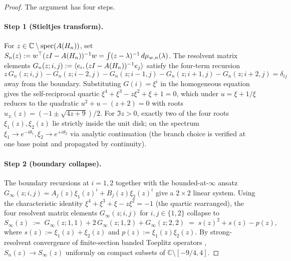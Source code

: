 \begin{proof}
The argument has four steps.

\paragraph{Step 1 (Stieltjes transform).}
For $z \in \mathbb{C} \setminus \operatorname{spec}(A(H_{n}))$, set
$S_{n}(z) := w^{\top}(zI - A(H_{n}))^{-1} w
= \int (z - \lambda)^{-1}\, d\mu_{w, n}(\lambda)$. The resolvent
matrix elements $G_{n}(z; i, j) := \langle e_{i}, (zI - A(H_{n}))^{-1} e_{j}\rangle$
satisfy the four-term recursion
\[
z\, G_{n}(z; i, j) - G_{n}(z; i-2, j) - G_{n}(z; i-1, j) - G_{n}(z; i+1, j) - G_{n}(z; i+2, j) = \delta_{ij}
\]
away from the boundary. Substituting $G(i) = \xi^{i}$ in the
homogeneous equation gives the self-reciprocal quartic
$\xi^{4} + \xi^{3} - z\xi^{2} + \xi + 1 = 0$, which under $u = \xi + 1/\xi$
reduces to the quadratic $u^{2} + u - (z + 2) = 0$ with roots
$u_{\pm}(z) = (-1 \pm \sqrt{4z + 9})/2$. For $\Im z > 0$, exactly two
of the four roots $\xi_{1}(z), \xi_{2}(z)$ lie strictly inside the
unit disk; on the spectrum
$\xi_{1} \to e^{-i\theta_{1}}, \xi_{2} \to e^{+i\theta_{2}}$ via
analytic continuation (the branch choice is verified at one base
point and propagated by continuity).

\paragraph{Step 2 (boundary collapse).}
The boundary recursions at $i = 1, 2$ together with the
bounded-at-$\infty$ ansatz $G_{\infty}(z; i, j) = A_{j}(z) \xi_{1}(z)^{i} + B_{j}(z) \xi_{2}(z)^{i}$
give a $2 \times 2$ linear system. Using the characteristic identity
$\xi^{4} + \xi^{3} + \xi - z\xi^{2} = -1$ (the quartic rearranged),
the four resolvent matrix elements $G_{\infty}(z; i, j)$ for
$i, j \in \{1, 2\}$ collapse to
\[
S_{\infty}(z) \;:=\; G_{\infty}(z; 1, 1) + 2\, G_{\infty}(z; 1, 2) + G_{\infty}(z; 2, 2)
\;=\; s(z)^{2} + s(z) - p(z),
\]
where $s(z) := \xi_{1}(z) + \xi_{2}(z)$ and
$p(z) := \xi_{1}(z) \xi_{2}(z)$. By strong-resolvent convergence of
finite-section banded Toeplitz operators \cite{BottcherSilbermann},
$S_{n}(z) \to S_{\infty}(z)$ uniformly on compact subsets of
$\mathbb{C} \setminus [-9/4, 4]$.


\end{proof}
